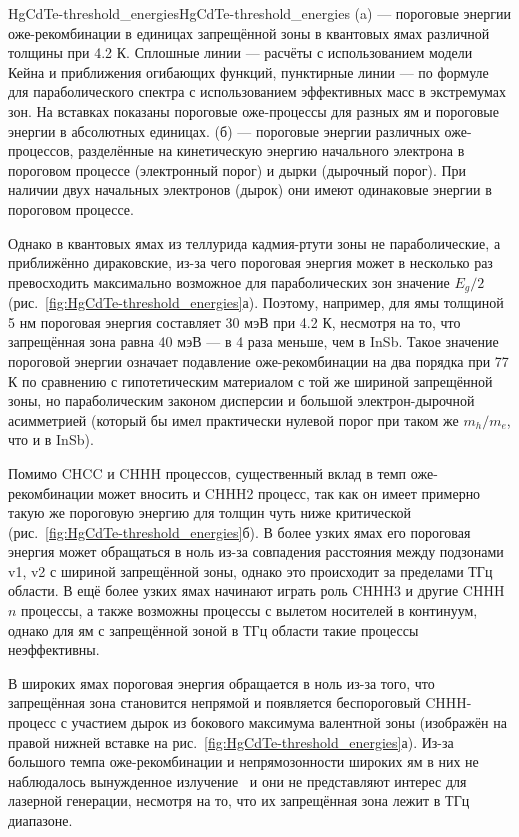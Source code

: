 \begin{fig}{HgCdTe-threshold_energies}{HgCdTe-threshold_energies} (a) --- пороговые энергии оже-рекомбинации в единицах запрещённой зоны в квантовых ямах \HgCdTe{} различной толщины при 4.2 К. Сплошные линии --- расчёты с использованием модели Кейна и приближения огибающих функций, пунктирные линии --- по формуле для параболического спектра с использованием эффективных масс в экстремумах зон. На вставках показаны пороговые оже-процессы для разных ям и пороговые энергии в абсолютных единицах. (б) --- пороговые энергии различных оже-процессов, разделённые на кинетическую энергию начального электрона в пороговом процессе (электронный порог) и дырки (дырочный порог). При наличии двух начальных электронов (дырок) они имеют одинаковые энергии в пороговом процессе.
\end{fig}

Однако в квантовых ямах из теллурида кадмия-ртути зоны не параболические, а приближённо дираковские, из-за чего пороговая энергия может в несколько раз превосходить максимально возможное для параболических зон значение $E_g/2$ (рис.~\ref{fig:HgCdTe-threshold_energies}а). Поэтому, например, для ямы толщиной 5 нм пороговая энергия составляет 30 мэВ при 4.2 К, несмотря на то, что запрещённая зона равна 40 мэВ --- в 4 раза меньше, чем в InSb. Такое значение пороговой энергии означает подавление оже-рекомбинации на два порядка при 77 К по сравнению с гипотетическим материалом с той же шириной запрещённой зоны, но параболическим законом дисперсии и большой электрон-дырочной асимметрией (который бы имел практически нулевой порог при таком же $m_h/m_e$, что и в InSb).

Помимо CHCC и CHHH процессов, существенный вклад в темп оже-рекомбинации может вносить и CHHH2 процесс, так как он имеет примерно такую же пороговую энергию для толщин чуть ниже критической (рис.~\ref{fig:HgCdTe-threshold_energies}б). В более узких ямах его пороговая энергия может обращаться в ноль из-за совпадения расстояния между подзонами v1, v2 с шириной запрещённой зоны, однако это происходит за пределами ТГц области. В ещё более узких ямах начинают играть роль CHHH3 и другие CHHH$n$ процессы, а также возможны процессы с вылетом носителей в континуум, однако для ям с запрещённой зоной в ТГц области такие процессы неэффективны.

В широких ямах пороговая энергия обращается в ноль из-за того, что запрещённая зона становится непрямой и появляется беспороговый CHHH-процесс с участием дырок из бокового максимума валентной зоны (изображён на правой нижней вставке на рис.~\ref{fig:HgCdTe-threshold_energies}а). Из-за большого темпа оже-рекомбинации и непрямозонности широких ям в них не наблюдалось вынужденное излучение~\cite{HgCdTe-narrow_vs_wide} и они не представляют интерес для лазерной генерации, несмотря на то, что их запрещённая зона лежит в ТГц диапазоне.

